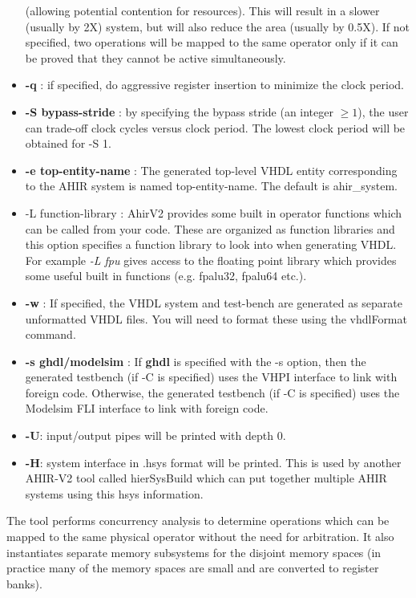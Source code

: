 \begin{itemize}
(allowing potential contention for resources).  This will
result in a slower (usually by 2X) system, but will
also reduce the area (usually by 0.5X).  If not specified,
two operations will be mapped to the same
operator  only if it can be proved that they cannot be active simultaneously.
\item {\bf -q } : if specified, do aggressive register insertion
to minimize the clock period.
\item {\bf -S bypass-stride } : by specifying the bypass stride
(an integer $\geq 1$),
the user can trade-off clock cycles versus clock period.  
The lowest clock period will be obtained for -S 1.   
\item {\bf -e top-entity-name} : The generated top-level VHDL entity
corresponding to the AHIR system is named top-entity-name.  The default
is ahir\_system.
\item {-L function-library} : AhirV2 provides some built in operator
functions which can be called from your code.  These are organized
as function libraries and this option specifies a function library
to look into when generating VHDL.  For example {\em -L fpu} gives
access to the floating point library which provides some useful
built in functions (e.g. fpalu32, fpalu64 etc.).
\item {\bf -w} :  If specified, the VHDL system and test-bench are
generated as separate unformatted VHDL files.  You will need to
format these using the vhdlFormat command.
\item {\bf -s ghdl/modelsim} :  If {\bf ghdl} is specified
with the -s option, then the generated testbench (if -C is specified)
uses the VHPI interface to link with foreign code.  Otherwise,
the generated testbench (if -C is specified) uses the Modelsim FLI
interface to link with foreign code.
\item {\bf -U}: input/output pipes will be printed with depth 0. 
\item {\bf -H}: system interface in .hsys format will be printed.   This
is used by another AHIR-V2 tool called hierSysBuild which can put together
multiple AHIR systems using this hsys information.
\end{itemize}

The tool performs concurrency analysis to determine operations which
can be mapped to the same physical operator without the need for
arbitration.  It also instantiates separate memory subsystems for
the disjoint memory spaces (in practice many of the memory spaces
are small and are converted to register banks).


